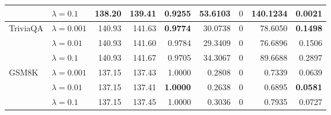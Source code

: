 \begin{table}[t]
{\begin{tabular}{l l rrrrrrr}
 & $\lambda{=}0.1$ & 138.20 & 139.41 & \cellcolor{red!18} \textbf{0.9255} & \cellcolor{red!18} 53.6103 & \cellcolor{cyan!12} $0$ & \cellcolor{red!18} 140.1234 & \cellcolor{red!18} \textbf{0.0021} \\
\midrule
TriviaQA & $\lambda{=}0.001$ & 140.93 & 141.63 & \textbf{0.9774} & 30.0738 & \cellcolor{cyan!12} $0$ & 78.6050 & \textbf{0.1498} \\
 & $\lambda{=}0.01$ & 140.93 & 141.60 & 0.9784 & 29.3409 & \cellcolor{cyan!12} $0$ & 76.6896 & 0.1506 \\
 & $\lambda{=}0.1$ & 140.93 & 141.67 & 0.9705 & 34.3067 & \cellcolor{cyan!12} $0$ & 89.6688 & 0.2897 \\
\midrule
GSM8K & $\lambda{=}0.001$ & 137.15 & 137.43 & 1.0000 & 0.2808 & \cellcolor{cyan!12} $0$ & 0.7339 & 0.0639 \\
 & $\lambda{=}0.01$ & 137.15 & 137.41 & \textbf{1.0000} & 0.2638 & \cellcolor{cyan!12} $0$ & 0.6895 & \textbf{0.0581} \\
 & $\lambda{=}0.1$ & 137.15 & 137.45 & 1.0000 & 0.3036 & \cellcolor{cyan!12} $0$ & 0.7935 & 0.0727 \\
\bottomrule
\end{tabular}}
\end{table}
